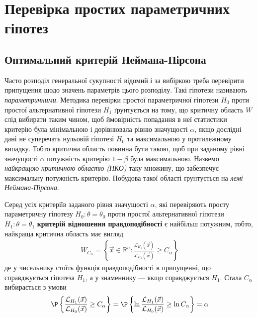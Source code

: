 \section{Перевірка простих параметричних гіпотез}
\subsection{Оптимальний критерій Неймана-Пірсона}

Часто розподіл генеральної сукупності відомий і за вибіркою треба перевірити 
припущення щодо значень параметрів цього розподілу. Такі гіпотези називають 
\emph{параметричними}. Методика перевірки простої параметричної гіпотези $H_0$
проти простої альтернативної гіпотези $H_1$ ґрунтується на тому, що критичну область $W$
слід вибирати таким чином, щоб ймовірність попадання в неї статистики критерію була мінімальною і 
дорівнювала рівню значущості $\alpha$, якщо дослідні дані не суперечать нульовій гіпотезі $H_0$ та 
максимальною у протилежному випадку. 
Тобто критична область повинна бути такою, щоб при заданому рівні значущості $\alpha$ потужність критерію
$1-\beta$ була максимальною. Назвемо \emph{найкращою критичною областю (НКО)} таку множину, що забезпечує максимальну 
потужність критерію. Побудова такої області ґрунтується на \emph{лемі Неймана-Пірсона}.
\begin{theorem*}
    Серед усіх критеріїв заданого рівня значущості $\alpha$, які 
    перевіряють просту параметричну гіпотезу $H_0 : \theta = \theta_0$ проти простої альтернативної гіпотези 
    $H_1: \theta = \theta_1$ \textbf{критерій відношення правдоподібності} є найбільш потужним, тобто, найкраща критична область
    має вигляд
    \begin{gather}
        W_{C_\alpha} = \left\{
            \vec{x} \in \mathbb{R}^n : \frac{\mathcal{L}_{H_1}(\vec{x})}{\mathcal{L}_{H_0}(\vec{x})} \geq C_{\alpha}
         \right\}
    \end{gather}
    де у чисельнику стоїть функція правдоподібності в припущенні, що справджується 
    гіпотеза $H_1$, а у знаменнику --- якщо справджується $H_1$. Стала $C_{\alpha}$ вибирається з умови
    \begin{gather}
        \P \left\{ \frac{\mathcal{L}_{H_1}(\vec{x})}{\mathcal{L}_{H_0}(\vec{x})} \geq C_{\alpha}\right\} = 
        \P \left\{ \ln\frac{\mathcal{L}_{H_1}(\vec{x})}{\mathcal{L}_{H_0}(\vec{x})} \geq \ln C_{\alpha}\right\} = \alpha
    \end{gather}
\end{theorem*}
